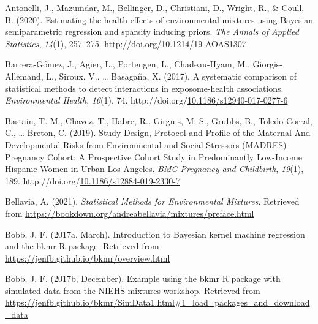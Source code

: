 \documentclass[12pt, twoside]{amherstthesis}
\newenvironment{CSLReferences}[2]%
  {}%
  {\par}
\begin{document}
\noindent

\setlength{\parindent}{-0.20in}
\setlength{\leftskip}{0.20in}
\setlength{\parskip}{8pt}

\hypertarget{refs}{}
\begin{CSLReferences}{1}{0}
\leavevmode{}%
Antonelli, J., Mazumdar, M., Bellinger, D., Christiani, D., Wright, R., \& Coull, B. (2020). Estimating the health effects of environmental mixtures using {Bayesian} semiparametric regression and sparsity inducing priors. \emph{The Annals of Applied Statistics}, \emph{14}(1), 257--275. http://doi.org/\href{https://doi.org/10.1214/19-AOAS1307}{10.1214/19-AOAS1307}

\leavevmode{}%
Barrera-Gómez, J., Agier, L., Portengen, L., Chadeau-Hyam, M., Giorgis-Allemand, L., Siroux, V., \ldots{} Basagaña, X. (2017). A systematic comparison of statistical methods to detect interactions in exposome-health associations. \emph{Environmental Health}, \emph{16}(1), 74. http://doi.org/\href{https://doi.org/10.1186/s12940-017-0277-6}{10.1186/s12940-017-0277-6}

\leavevmode{}%
Bastain, T. M., Chavez, T., Habre, R., Girguis, M. S., Grubbs, B., Toledo-Corral, C., \ldots{} Breton, C. (2019). Study {Design}, {Protocol} and {Profile} of the {Maternal} {And} {Developmental} {Risks} from {Environmental} and {Social} {Stressors} ({MADRES}) {Pregnancy} {Cohort}: A {Prospective} {Cohort} {Study} in {Predominantly} {Low}-{Income} {Hispanic} {Women} in {Urban} {Los} {Angeles}. \emph{BMC Pregnancy and Childbirth}, \emph{19}(1), 189. http://doi.org/\href{https://doi.org/10.1186/s12884-019-2330-7}{10.1186/s12884-019-2330-7}

\leavevmode{}%
Bellavia, A. (2021). \emph{Statistical {Methods} for {Environmental} {Mixtures}}. Retrieved from \url{https://bookdown.org/andreabellavia/mixtures/preface.html}

\leavevmode{}%
Bobb, J. F. (2017a, March). Introduction to {Bayesian} kernel machine regression and the bkmr {R} package. Retrieved from \url{https://jenfb.github.io/bkmr/overview.html}

\leavevmode{}%
Bobb, J. F. (2017b, December). Example using the bkmr {R} package with simulated data from the {NIEHS} mixtures workshop. Retrieved from \url{https://jenfb.github.io/bkmr/SimData1.html\#1_load_packages_and_download_data}


\end{CSLReferences}
\end{document}
